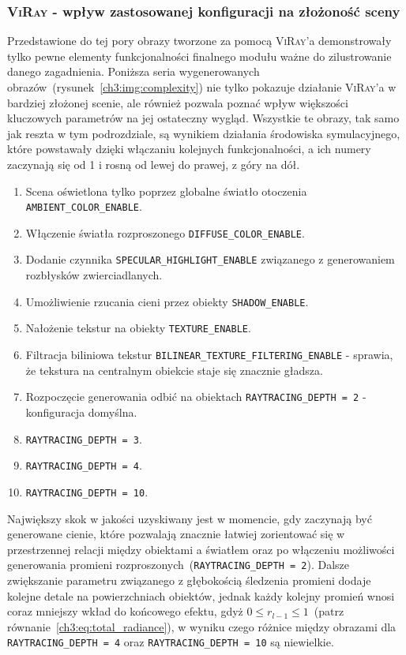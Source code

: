 \subsubsection{\textsc{ViRay} - wpływ zastosowanej konfiguracji na złożoność sceny}
Przedstawione do tej pory obrazy tworzone za pomocą \textsc{ViRay}'a demonstrowały tylko pewne elementy funkcjonalności finalnego modułu ważne do zilustrowanie danego zagadnienia. Poniższa seria wygenerowanych obrazów~(rysunek~\ref{ch3:img:complexity}) nie tylko pokazuje działanie \textsc{ViRay}'a w bardziej złożonej scenie, ale również pozwala poznać wpływ większości kluczowych parametrów na jej ostateczny wygląd. Wszystkie te obrazy, tak samo jak reszta w tym podrozdziale, są wynikiem działania środowiska symulacyjnego, które powstawały dzięki włączaniu kolejnych funkcjonalności, a ich numery zaczynają się od 1 i rosną od lewej do prawej, z góry na dół.
\begin{enumerate}
\item Scena oświetlona tylko poprzez globalne światło otoczenia \texttt{AMBIENT\_COLOR\_ENABLE}.
\item Włączenie światła rozproszonego \texttt{DIFFUSE\_COLOR\_ENABLE}.
\item Dodanie czynnika \texttt{SPECULAR\_HIGHLIGHT\_ENABLE} związanego z generowaniem rozbłysków zwierciadlanych.
\item Umożliwienie rzucania cieni przez obiekty \texttt{SHADOW\_ENABLE}.
\item Nałożenie tekstur na obiekty \texttt{TEXTURE\_ENABLE}.
\item Filtracja biliniowa tekstur \texttt{BILINEAR\_TEXTURE\_FILTERING\_ENABLE} - sprawia, że tekstura na centralnym obiekcie staje się znacznie gładsza.
\item Rozpoczęcie generowania odbić na obiektach \texttt{RAYTRACING\_DEPTH = 2} - konfiguracja domyślna.
\item \texttt{RAYTRACING\_DEPTH = 3}.
\item \texttt{RAYTRACING\_DEPTH = 4}.
\item \texttt{RAYTRACING\_DEPTH = 10}.
\end{enumerate}

Największy skok w jakości uzyskiwany jest w momencie, gdy zaczynają być generowane cienie, które pozwalają znacznie łatwiej zorientować się w przestrzennej relacji między obiektami a światłem oraz po włączeniu możliwości generowania promieni rozproszonych~(\texttt{RAYTRACING\_DEPTH = 2}). Dalsze zwiększanie parametru związanego z głębokością śledzenia promieni dodaje kolejne detale na powierzchniach obiektów, jednak każdy kolejny promień wnosi coraz mniejszy wkład do końcowego efektu, gdyż $0 \leq r_{l-1} \leq 1$~(patrz równanie~\eqref{ch3:eq:total_radiance}), w wyniku czego różnice między obrazami dla \texttt{RAYTRACING\_DEPTH = 4} oraz \texttt{RAYTRACING\_DEPTH = 10} są niewielkie.

